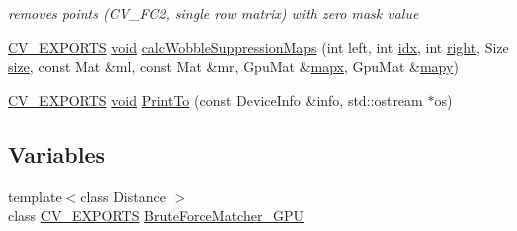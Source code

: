\begin{DoxyCompactItemize}
\begin{DoxyCompactList}\small\item\em removes points (C\-V\-\_\-F\-C2, single row matrix) with zero mask value \end{DoxyCompactList}\item 
\hyperlink{core_2types__c_8h_a1bf9f0e121b54272da02379cfccd0a2b}{C\-V\-\_\-\-E\-X\-P\-O\-R\-T\-S} \hyperlink{legacy_8hpp_a8bb47f092d473522721002c86c13b94e}{void} \hyperlink{namespacecv_1_1gpu_a42baee27c9d9bcc9a66b0854829f42f2}{calc\-Wobble\-Suppression\-Maps} (int left, int \hyperlink{core__c_8h_a5c7c842f447336aa2f10826df65a28b3}{idx}, int \hyperlink{legacy_8hpp_a6b04b878081bf724144b73c75dfd1894}{right}, Size \hyperlink{legacy_8hpp_ae97003f8d5c64cdfb99f6f2606d121b6}{size}, const Mat \&ml, const Mat \&mr, Gpu\-Mat \&\hyperlink{imgproc__c_8h_a81ed33f30ee89704887ae4e4dbb20d46}{mapx}, Gpu\-Mat \&\hyperlink{imgproc__c_8h_a934abd37467ed645178fbe201add061e}{mapy})
\item 
\hyperlink{core_2types__c_8h_a1bf9f0e121b54272da02379cfccd0a2b}{C\-V\-\_\-\-E\-X\-P\-O\-R\-T\-S} \hyperlink{legacy_8hpp_a8bb47f092d473522721002c86c13b94e}{void} \hyperlink{namespacecv_1_1gpu_a1cf93194b02d6a71eb65bcbb028c41f1}{Print\-To} (const Device\-Info \&info, std\-::ostream $\ast$os)
\end{DoxyCompactItemize}
\subsection*{Variables}
\begin{DoxyCompactItemize}
\item 
{\footnotesize template$<$class Distance $>$ }\\class \hyperlink{core_2types__c_8h_a1bf9f0e121b54272da02379cfccd0a2b}{C\-V\-\_\-\-E\-X\-P\-O\-R\-T\-S} \hyperlink{namespacecv_1_1gpu_acbc5d694c0272fc1b8252c4f9886dbee}{Brute\-Force\-Matcher\-\_\-\-G\-P\-U}
\end{DoxyCompactItemize}


